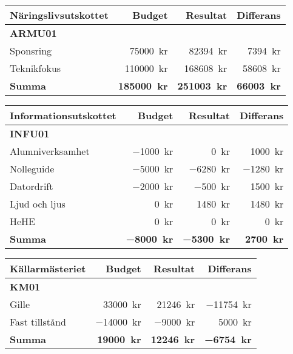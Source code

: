 \documentclass[../_main/handlingar.tex]{subfiles}
\begin{document}
\begin{tabularx}{12cm}{X r r r}
    \textbf{\large Näringslivsutskottet} & \textbf{Budget} & \textbf{Resultat} & \textbf{Differans} \\
    \hline
    \textbf{ARMU01} \\
    Sponsring & \SI{75000}{kr} & \SI{82394}{kr} & \SI{7394}{kr} \\
    Teknikfokus & \SI{110000}{kr} & \SI{168608}{kr} & \SI{58608}{kr} \\
    \hline
    \textbf{Summa} & \textbf{\SI{185000}{kr}} & \textbf{\SI{251003}{kr}} & \textbf{\SI{66003}{kr}} \\
\end{tabularx}

\begin{tabularx}{12cm}{X r r r}
    \textbf{\large Informationsutskottet} & \textbf{Budget} & \textbf{Resultat} & \textbf{Differans} \\
    \hline
    \textbf{INFU01} \\
    Alumniverksamhet & \SI{-1000}{kr} & \SI{0}{kr} & \SI{1000}{kr} \\
    Nolleguide & \SI{-5000}{kr} & \SI{-6280}{kr} & \SI{-1280}{kr} \\
    Datordrift & \SI{-2000}{kr} & \SI{-500}{kr} & \SI{1500}{kr} \\
    Ljud och ljus & \SI{0}{kr} & \SI{1480}{kr} & \SI{1480}{kr} \\
    HeHE & \SI{0}{kr} & \SI{0}{kr} & \SI{0}{kr} \\
    \hline
    \textbf{Summa} & \textbf{\SI{-8000}{kr}} & \textbf{\SI{-5300}{kr}} & \textbf{\SI{2700}{kr}} \\
\end{tabularx}

\begin{tabularx}{12cm}{X r r r}
    \textbf{\large Källarmästeriet} & \textbf{Budget} & \textbf{Resultat} & \textbf{Differans} \\
    \hline
    \textbf{KM01} \\
    Gille & \SI{33000}{kr} & \SI{21246}{kr} & \SI{-11754}{kr} \\
    Fast tillstånd & \SI{-14000}{kr} & \SI{-9000}{kr} & \SI{5000}{kr} \\
    \hline
    \textbf{Summa} & \textbf{\SI{19000}{kr}} & \textbf{\SI{12246}{kr}} & \textbf{\SI{-6754}{kr}} \\
\end{tabularx}
\end{document}
